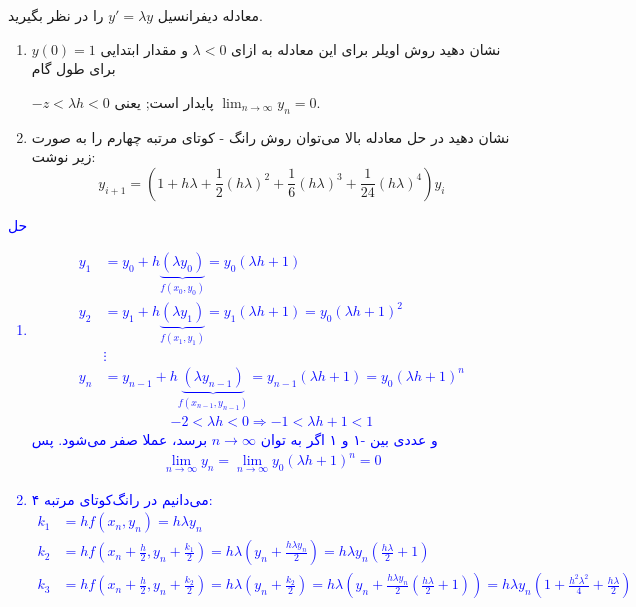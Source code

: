 معادله دیفرانسیل
$y' = \lambda y$
را در نظر بگیرید.
\begin{enumerate}
    \item 
    نشان دهید روش اویلر برای این معادله به ازای
    $\lambda < 0$ و مقدار ابتدایی 
    $y(0) = 1$
    برای طول گام
    
    $-z < \lambda h < 0$
    پایدار است; یعنی
    $\lim_{{n \to \infty}} y_n = 0$.
    \item 
    نشان دهید در حل معادله بالا می‌توان روش رانگ - کوتای مرتبه چهارم را به صورت زیر نوشت:
    \[y_{i+1} = (1 + h\lambda + \frac{1}{2}(h\lambda)^2 + \frac{1}{6}(h\lambda)^3 + \frac{1}{24}(h\lambda)^4)y_i\]
\end{enumerate}
\textcolor{blue}{حل
\begin{enumerate}
    \item 
    \begin{align*}
        y_1 &= y_0 + h\underbrace{(\lambda y_0)}_{f(x_0,y_0)} = y_0 (\lambda h + 1) \\
        y_2 &= y_1 + h \underbrace{(\lambda y_1)}_{f(x_1,y_1)} = y_1 (\lambda h + 1) = y_0 (\lambda h + 1)^2 \\
        &\vdots \\
        y_n &= y_{n - 1} + h\underbrace{(\lambda y_{n - 1})}_{f(x_{n - 1}, y_{n - 1})} = y_{n - 1}(\lambda h + 1) = y_0 (\lambda h + 1)^n
    \end{align*}
    \begin{align*}
        -2 < \lambda h < 0 \Rightarrow -1 < \lambda h + 1 < 1
    \end{align*}
    و عددی بین 
    -۱ و 
    ۱ اگر به توان
    $n \rightarrow \infty$
    برسد، عملا صفر می‌شود. پس
    \begin{align*}
        \lim_{n \to \infty} y_n = \lim_{n \to \infty} y_0 (\lambda h  + 1)^n= 0
    \end{align*}
    \item 
    می‌دانیم در رانگ‌کوتای مرتبه ۴:
    \begin{align*}
        k_1 &= hf(x_n,y_n) = h \lambda y_n \\
        k_2 &= hf(x_n + \frac{h}{2}, y_n + \frac{k_1}{2}) = h \lambda (y_n + \frac{h \lambda y_n}{2}) = h \lambda y_n (\frac{h \lambda}{2} + 1) \\
        k_3 &= hf(x_n + \frac{h}{2}, y_{n} + \frac{k_2}{2}) = h\lambda (y_n + \frac{k_2}{2}) = h \lambda (y_n + \frac{h \lambda y_n}{2} (\frac{h \lambda }{2} + 1)) = h \lambda y_n (1 + \frac{h^2 \lambda^2}{4} + \frac{h \lambda}{2}) \\

\end{align*}
\end{enumerate}}
